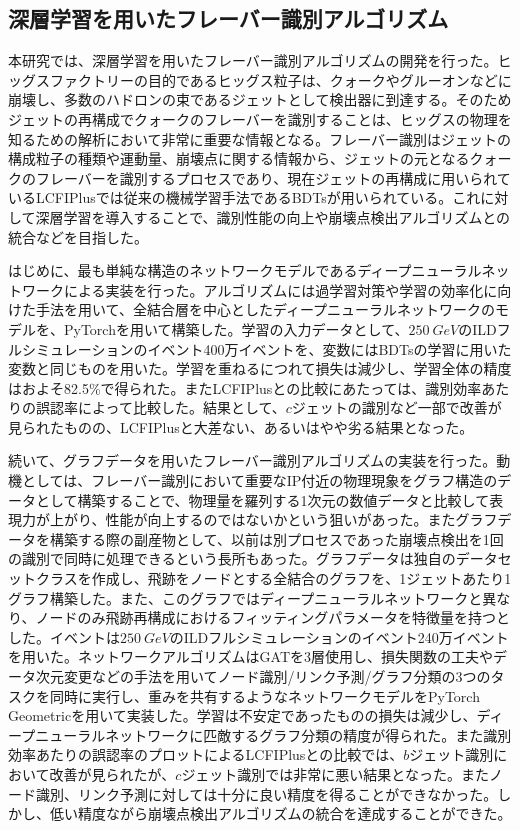 \subsection*{深層学習を用いたフレーバー識別アルゴリズム}
本研究では、深層学習を用いたフレーバー識別アルゴリズムの開発を行った。ヒッグスファクトリーの目的であるヒッグス粒子は、クォークやグルーオンなどに崩壊し、多数のハドロンの束であるジェットとして検出器に到達する。そのためジェットの再構成でクォークのフレーバーを識別することは、ヒッグスの物理を知るための解析において非常に重要な情報となる。フレーバー識別はジェットの構成粒子の種類や運動量、崩壊点に関する情報から、ジェットの元となるクォークのフレーバーを識別するプロセスであり、現在ジェットの再構成に用いられているLCFIPlusでは従来の機械学習手法であるBDTsが用いられている。これに対して深層学習を導入することで、識別性能の向上や崩壊点検出アルゴリズムとの統合などを目指した。

はじめに、最も単純な構造のネットワークモデルであるディープニューラルネットワークによる実装を行った。アルゴリズムには過学習対策や学習の効率化に向けた手法を用いて、全結合層を中心としたディープニューラルネットワークのモデルを、PyTorchを用いて構築した。学習の入力データとして、$\SI{250}{GeV}$のILDフルシミュレーションのイベント400万イベントを、変数にはBDTsの学習に用いた変数と同じものを用いた。学習を重ねるにつれて損失は減少し、学習全体の精度はおよそ82.5\%で得られた。またLCFIPlusとの比較にあたっては、識別効率あたりの誤認率によって比較した。結果として、$c$ジェットの識別など一部で改善が見られたものの、LCFIPlusと大差ない、あるいはやや劣る結果となった。

続いて、グラフデータを用いたフレーバー識別アルゴリズムの実装を行った。動機としては、フレーバー識別において重要なIP付近の物理現象をグラフ構造のデータとして構築することで、物理量を羅列する1次元の数値データと比較して表現力が上がり、性能が向上するのではないかという狙いがあった。またグラフデータを構築する際の副産物として、以前は別プロセスであった崩壊点検出を1回の識別で同時に処理できるという長所もあった。グラフデータは独自のデータセットクラスを作成し、飛跡をノードとする全結合のグラフを、1ジェットあたり1グラフ構築した。また、このグラフではディープニューラルネットワークと異なり、ノードのみ飛跡再構成におけるフィッティングパラメータを特徴量を持つとした。イベントは$\SI{250}{GeV}$のILDフルシミュレーションのイベント240万イベントを用いた。ネットワークアルゴリズムはGATを3層使用し、損失関数の工夫やデータ次元変更などの手法を用いてノード識別/リンク予測/グラフ分類の3つのタスクを同時に実行し、重みを共有するようなネットワークモデルをPyTorch Geometricを用いて実装した。学習は不安定であったものの損失は減少し、ディープニューラルネットワークに匹敵するグラフ分類の精度が得られた。また識別効率あたりの誤認率のプロットによるLCFIPlusとの比較では、$b$ジェット識別において改善が見られたが、$c$ジェット識別では非常に悪い結果となった。またノード識別、リンク予測に対しては十分に良い精度を得ることができなかった。しかし、低い精度ながら崩壊点検出アルゴリズムの統合を達成することができた。

